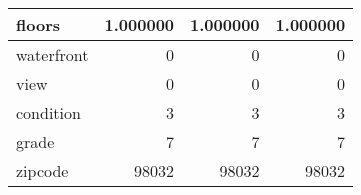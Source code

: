 \begin{table}[H]
\begin{tabular}{|l|r|r|r|}
\hline floors & \cellcolor[rgb]{0.9, 0.54, 0.52} 1.000000 & \cellcolor[rgb]{0.9, 0.54, 0.52} 1.000000 & \cellcolor[rgb]{0.9, 0.54, 0.52} 1.000000 \\
\hline waterfront & \cellcolor[rgb]{0.9, 0.54, 0.52} 0 & \cellcolor[rgb]{0.9, 0.54, 0.52} 0 & \cellcolor[rgb]{0.9, 0.54, 0.52} 0 \\
\hline view & \cellcolor[rgb]{0.9, 0.54, 0.52} 0 & \cellcolor[rgb]{0.9, 0.54, 0.52} 0 & \cellcolor[rgb]{0.9, 0.54, 0.52} 0 \\
\hline condition & \cellcolor[rgb]{0.9, 0.54, 0.52} 3 & \cellcolor[rgb]{0.9, 0.54, 0.52} 3 & \cellcolor[rgb]{0.9, 0.54, 0.52} 3 \\
\hline grade & \cellcolor[rgb]{0.9, 0.54, 0.52} 7 & \cellcolor[rgb]{0.9, 0.54, 0.52} 7 & \cellcolor[rgb]{0.9, 0.54, 0.52} 7 \\
\hline zipcode & \cellcolor[rgb]{0.9, 0.54, 0.52} 98032 & \cellcolor[rgb]{0.9, 0.54, 0.52} 98032 & \cellcolor[rgb]{0.9, 0.54, 0.52} 98032 \\
\hline
\end{tabular}
\end{table}
